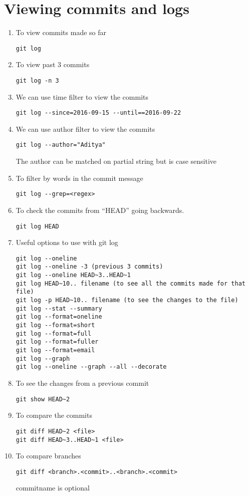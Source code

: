 \documentclass[paper=a4, fontsize=12pt]{scrartcl}
\begin{document}
\section*{Viewing commits and logs}
\begin{enumerate}
\item To view commits made so far
\begin{lstlisting}
git log
\end{lstlisting}
\item To view past $3$ commits
\begin{lstlisting}
git log -n 3
\end{lstlisting}
\item We can use time filter to view the commits
\begin{lstlisting}
git log --since=2016-09-15 --until==2016-09-22
\end{lstlisting}
\item We can use author filter to view the commits
\begin{lstlisting}
git log --author="Aditya"
\end{lstlisting}
The author can be matched on partial string but is case sensitive
\item To filter by words in the commit message
\begin{lstlisting}
git log --grep=<regex>
\end{lstlisting}
\item To check the commits from ``HEAD'' going backwards.
\begin{lstlisting}
git log HEAD
\end{lstlisting}
\item Useful options to use with git log
\begin{lstlisting}
git log --oneline
git log --oneline -3 (previous 3 commits)
git log --oneline HEAD~3..HEAD~1
git log HEAD~10.. filename (to see all the commits made for that file)
git log -p HEAD~10.. filename (to see the changes to the file)
git log --stat --summary
git log --format=oneline
git log --format=short
git log --format=full
git log --format=fuller
git log --format=email
git log --graph
git log --oneline --graph --all --decorate
\end{lstlisting}
\item To see the changes from a previous commit
\begin{lstlisting}
git show HEAD~2
\end{lstlisting}
\item To compare the commits
\begin{lstlisting}
git diff HEAD~2 <file>
git diff HEAD~3..HEAD~1 <file>
\end{lstlisting}
\item To compare branches
\begin{lstlisting}
git diff <branch>.<commit>..<branch>.<commit>
\end{lstlisting}
commitname is optional
\end{enumerate}
\end{document}

